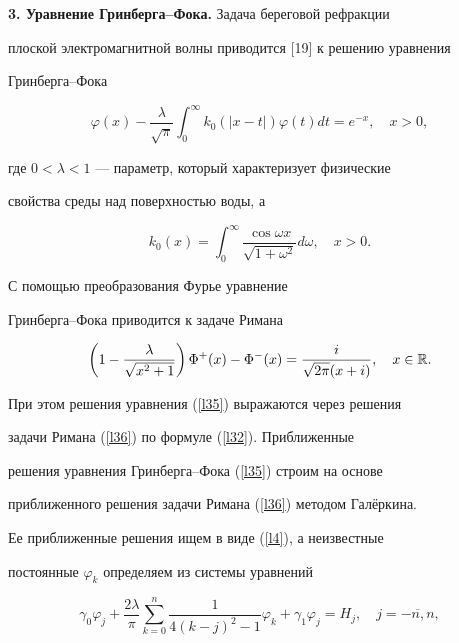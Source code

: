 {\bf 3. Уравнение Гринберга--Фока.} Задача береговой рефракции


плоской электромагнитной волны приводится [19] к решению уравнения


Гринберга--Фока


\begin{equation}


\label{l35}


\varphi(x)-\frac{\lambda}{{\displaystyle\sqrt{\pi}}}


{\displaystyle\int_{0}^\infty}


k_0(|x-t|)\varphi(t)dt = e^{-x}, \quad x > 0,


\end{equation}


где $0<\lambda<1$ --- параметр, который характеризует физические


свойства среды над поверхностью воды, а


$$


k_0(x)=\int_0^\infty\frac{\cos \omega


x}{\sqrt{1+\omega^2}}d\omega, \quad x>0.


$$


С помощью преобразования Фурье уравнение


Гринберга--Фока приводится к задаче Римана


\begin{equation}


\label{l36}


\left(1-\frac{\lambda}{\sqrt{x^2+1}}\right)


\Phi^+(x)-\Phi^-(x)=\frac{i}{\sqrt{2\pi}(x+i)},


\quad x\in \Bbb R.


\end{equation}


При этом решения уравнения (\ref{l35}) выражаются через решения


задачи Римана (\ref{l36}) по формуле (\ref{l32}). Приближенные


решения уравнения Гринберга--Фока (\ref{l35}) строим на основе


приближенного решения задачи Римана (\ref{l36}) методом Гал\"еркина.


Ее приближенные решения ищем в виде (\ref{l4}), а неизвестные


постоянные $\varphi_k$ определяем из системы уравнений


\begin{equation}


\label{l37}


\gamma_0\varphi_j+\frac{2\lambda}{\pi}\sum\limits_{k=0}^n


\frac{1}{4(k-j)^2-1}\varphi_k+\gamma_1\varphi_j=H_j,


\quad j=\overline{-n,n},


\end{equation}


